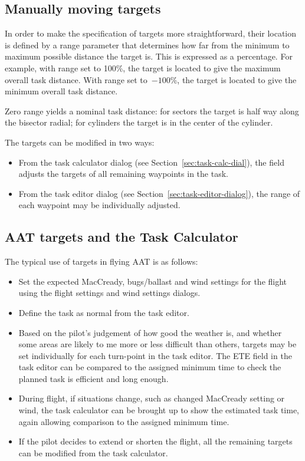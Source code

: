 \documentclass[a4paper,12pt]{refrep}
\begin{document}
\subsection*{Manually moving targets}

In order to make the specification of targets more straightforward,
their location is defined by a range parameter that determines how
far from the minimum to maximum possible distance the target is.  This
is expressed as a percentage.  For example, with range set to 100\%,
the target is located to give the maximum overall task distance.  With
range set to~$-100$\%, the target is located to give the minimum overall
task distance.  

Zero range yields a nominal task distance: for sectors the target is
half way along the bisector radial; for cylinders the target is in the
center of the cylinder.

The targets can be modified in two ways:
\begin{itemize}
\item From the task calculator dialog (see 
 Section~\ref{sec:task-calc-dial}), the  field adjusts the
 targets of all remaining waypoints in the task.
\item From the task editor dialog (see 
 Section~\ref{sec:task-editor-dialog}), the range of each waypoint may
 be individually adjusted.
\end{itemize}

\subsection*{AAT targets and the Task Calculator}

The typical use of targets in flying AAT is as follows:
\begin{itemize}
\item Set the expected MacCready, bugs/ballast and wind settings
  for the flight using the flight settings and wind settings dialogs.
\item Define the task as normal from the task editor.
\item Based on the pilot's judgement of how good the weather is,
  and whether some areas are likely to me more or less difficult than
  others, targets may be set individually for each turn-point in the
  task editor.  The ETE field in the task editor can be compared to
  the assigned minimum time to check the planned task is efficient and
  long enough.
\item During flight, if situations change, such as changed MacCready setting
  or wind, the task calculator can be brought up to show the estimated
  task time, again allowing comparison to the assigned minimum time.
\item If the pilot decides to extend or shorten the flight, all the remaining
  targets can be modified from the task calculator. 
\end{itemize}
\end{document}
